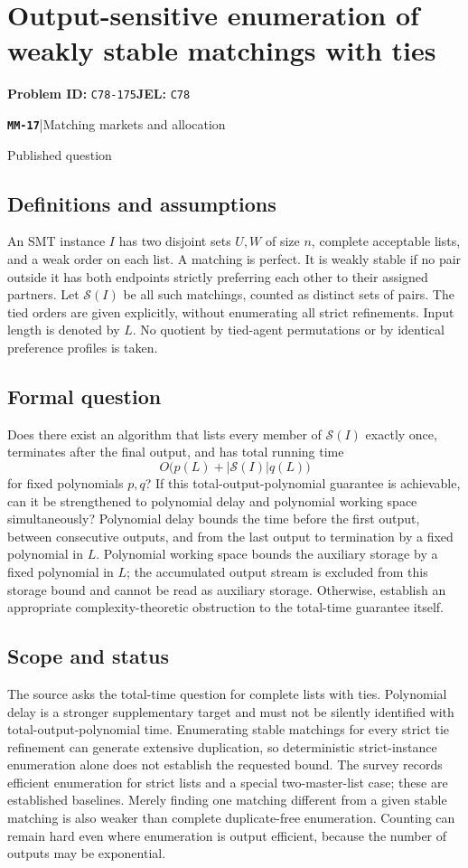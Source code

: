 \documentclass[11pt,a4paper]{article}
\newcommand{\entrymeta}[3]{{\sffamily\small\color{muted}\textbf{\texttt{#1}}\quad|\quad #2\par #3\par}}
\begin{document}
\section*{Output-sensitive enumeration of weakly stable matchings with ties}
\textbf{Problem ID:} \texttt{C78-175}\quad \textbf{JEL:} \texttt{C78}\par
\label{problem:OP-0558}
\label{beyond:MM-17}
\entrymeta{MM-17}{Matching markets and allocation}{Published question}
\subsection*{Definitions and assumptions}
An SMT instance $I$ has two disjoint sets $U,W$ of size $n$, complete acceptable lists, and a weak order on each list. A matching is perfect. It is weakly stable if no pair outside it has both endpoints strictly preferring each other to their assigned partners. Let $\mathcal S(I)$ be all such matchings, counted as distinct sets of pairs. The tied orders are given explicitly, without enumerating all strict refinements. Input length is denoted by $L$. No quotient by tied-agent permutations or by identical preference profiles is taken.
\subsection*{Formal question}
Does there exist an algorithm that lists every member of $\mathcal S(I)$ exactly once, terminates after the final output, and has total running time
\[
 O\bigl(p(L)+|\mathcal S(I)|q(L)\bigr)
\]
for fixed polynomials $p,q$? If this total-output-polynomial guarantee is achievable, can it be strengthened to polynomial delay and polynomial working space simultaneously? Polynomial delay bounds the time before the first output, between consecutive outputs, and from the last output to termination by a fixed polynomial in $L$. Polynomial working space bounds the auxiliary storage by a fixed polynomial in $L$; the accumulated output stream is excluded from this storage bound and cannot be read as auxiliary storage. Otherwise, establish an appropriate complexity-theoretic obstruction to the total-time guarantee itself.
\subsection*{Scope and status}
The source asks the total-time question for complete lists with ties. Polynomial delay is a stronger supplementary target and must not be silently identified with total-output-polynomial time. Enumerating stable matchings for every strict tie refinement can generate extensive duplication, so deterministic strict-instance enumeration alone does not establish the requested bound. The survey records efficient enumeration for strict lists and a special two-master-list case; these are established baselines. Merely finding one matching different from a given stable matching is also weaker than complete duplicate-free enumeration. Counting can remain hard even where enumeration is output efficient, because the number of outputs may be exponential.
\end{document}
